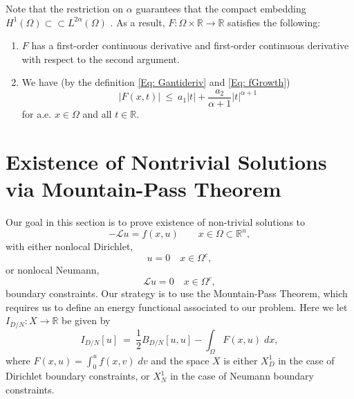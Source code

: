 \documentclass[11pt]{amsart}   	%
\theoremstyle{plain}
\numberwithin{equation}{section}
\def\al{\alpha}
\def\Om{\Omega}
\def\R{\mathbb{R}}
\begin{document}
Note that the restriction on $\al$ guarantees that the compact embedding $H^1(\Om) \subset \subset L^{2\al}(\Om)$  \cite[Theorem 9.16]{brezis2011functional}.
As a result, $F: \Om \times \R \rightarrow \R$ satisfies the following:
        \begin{enumerate}[label=\textbf{H\arabic*}]
        \item\label{H1} $F$ has a first-order continuous derivative and first-order continuous derivative with respect to the second argument.
        \item We have (by the definition \eqref{Eq: Gantideriv} and \eqref{Eq: fGrowth})
        \begin{equation}\label{Eq: FGrowth}
        |F(x, t)| \ \leq\ a_1|t| + \frac{a_2}{\al + 1}|t|^{\al + 1}
        \end{equation}
        for a.e. $x \in \Om$ and all $ t \in \R$.
    \end{enumerate}



\section{Existence of Nontrivial Solutions via Mountain-Pass Theorem}\label{s:mountain-pass}

Our goal in this section is to prove existence of non-trivial solutions to 
\begin{equation}\label{e:problem2}
-\mathcal{L}u =f(x,u) \qquad x \in \Omega \subset \R^n,
\end{equation}
with either nonlocal Dirichlet,
\[ u = 0 \quad x \in \Omega^c,\]
or nonlocal Neumann,
\[\mathcal{L} u = 0 \quad x \in \Omega^c,\]
boundary constraints.
 Our strategy is to use the  Mountain-Pass Theorem, which requires us to define an energy functional associated to our problem. Here we let $I_{D/N}: X \longrightarrow \R$ be given by
\begin{equation}\label{Eq: convolveEnergy}
 I_{D/N}[u] \ = \ \frac{1}{2} B_{D/N}[u,u] - \int_\Omega F(x,u) \;dx,
 \end{equation}
where $F(x,u) = \int_0^u f(x,v) \;dv$ and the space $X$ is either $X^1_D$ in the case of Dirichlet boundary constraints, or $X^1_N$ in the case of Neumann boundary constraints. 
\end{document}
